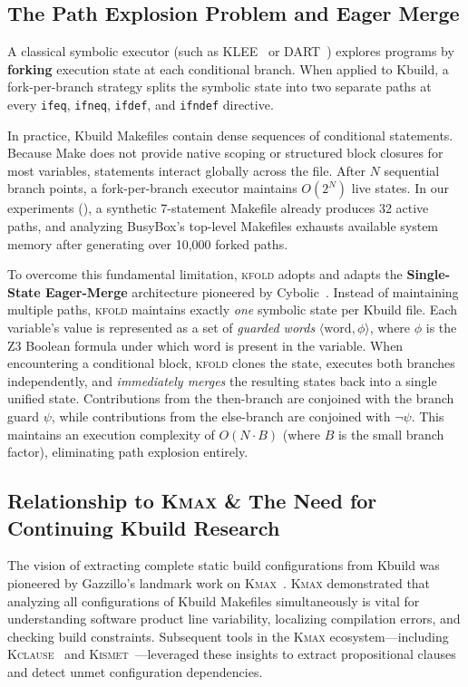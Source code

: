 \documentclass[acmsmall,screen,review]{acmart}
\newcommand{\tool}{\textsc{kfold}\xspace}
\begin{document}
\subsection{The Path Explosion Problem and Eager Merge}
\label{sec:intro:path-explosion}

A classical symbolic executor (such as KLEE~\cite{cadar2008klee} or DART~\cite{godefroid2005dart}) explores programs by \textbf{forking} execution state at each conditional branch. When applied to Kbuild, a fork-per-branch strategy splits the symbolic state into two separate paths at every \texttt{ifeq}, \texttt{ifneq}, \texttt{ifdef}, and \texttt{ifndef} directive.

In practice, Kbuild Makefiles contain dense sequences of conditional statements. Because Make does not provide native scoping or structured block closures for most variables, statements interact globally across the file. After $N$ sequential branch points, a fork-per-branch executor maintains $O(2^N)$ live states. In our experiments (), a synthetic 7-statement Makefile already produces 32 active paths, and analyzing BusyBox's top-level Makefiles exhausts available system memory after generating over 10,000 forked paths.

To overcome this fundamental limitation, \tool adopts and adapts the \textbf{Single-State Eager-Merge} architecture pioneered by Cybolic~\cite{cybolic}. Instead of maintaining multiple paths, \tool maintains exactly \emph{one} symbolic state per Kbuild file. Each variable's value is represented as a set of \emph{guarded words} $\langle \text{word}, \phi \rangle$, where $\phi$ is the Z3 Boolean formula under which $\text{word}$ is present in the variable. When encountering a conditional block, \tool clones the state, executes both branches independently, and \emph{immediately merges} the resulting states back into a single unified state. Contributions from the then-branch are conjoined with the branch guard $\psi$, while contributions from the else-branch are conjoined with $\neg \psi$. This maintains an execution complexity of $O(N \cdot B)$ (where $B$ is the small branch factor), eliminating path explosion entirely.

\subsection{Relationship to \textsc{Kmax} \& The Need for Continuing Kbuild Research}
\label{sec:intro:kmax}

The vision of extracting complete static build configurations from Kbuild was pioneered by Gazzillo's landmark work on \textsc{Kmax}~\cite{kmax,gazzillo2018localizing}. \textsc{Kmax} demonstrated that analyzing all configurations of Kbuild Makefiles simultaneously is vital for understanding software product line variability, localizing compilation errors, and checking build constraints. Subsequent tools in the \textsc{Kmax} ecosystem---including \textsc{Kclause}~\cite{oh2021kclause} and \textsc{Kismet}~\cite{yildiran2021kismet}---leveraged these insights to extract propositional clauses and detect unmet configuration dependencies.
\end{document}

